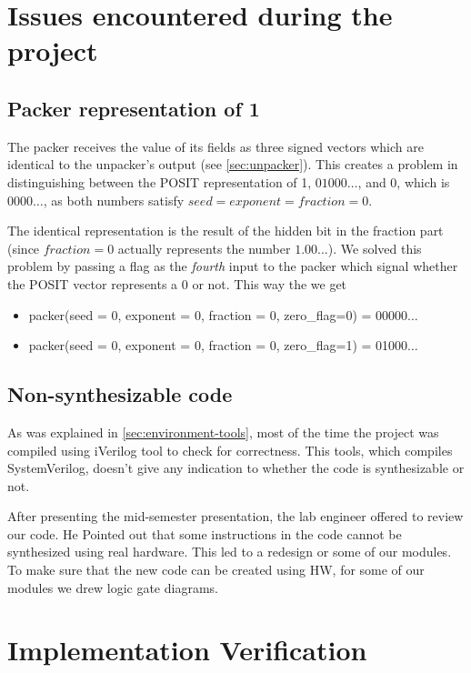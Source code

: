 \documentclass[10pt]{article}
\begin{document}
\section{Issues encountered during the project}\label{sec:issu-enco-during}

\subsection{Packer representation of 1}
\label{sec:pack-repr-1}

The packer receives the value of its fields as three signed vectors which are
identical to the unpacker's output (see \autoref{sec:unpacker}).
This creates a problem in distinguishing between the POSIT representation of 1,
$01000\dots$, and 0, which is $0000\dots$, as both numbers satisfy
$seed = exponent = fraction = 0$.

The identical representation is the result of the hidden bit in the fraction
part (since $fraction = 0$ actually represents the number $1.00\dots$). We
solved this problem by passing a flag as the \textit{fourth} input to the
packer which signal whether the POSIT vector represents a 0 or not. This way the
we get
\begin{itemize}
  \item packer(seed = 0, exponent = 0, fraction = 0, zero\_flag=0) =
    00000$\dots$
  \item packer(seed = 0, exponent = 0, fraction = 0, zero\_flag=1) =
    01000$\dots$
\end{itemize}

\subsection{Non-synthesizable code}
\label{sec:non-synth-code}

As was explained in \autoref{sec:environment-tools}, most of the time the
project was compiled using iVerilog tool to check for correctness. This tools,
which compiles SystemVerilog, doesn't give any indication to whether the code is
synthesizable or not.

After presenting the mid-semester presentation, the lab engineer offered to review
our code. He Pointed out that some instructions in the code
cannot be synthesized using real hardware. This led to a redesign or some of our
modules. To make sure that the new code can be created using HW, for some of our
modules we drew logic gate diagrams.

\section{Implementation Verification}\label{sec:impl-verif}
\end{document}
